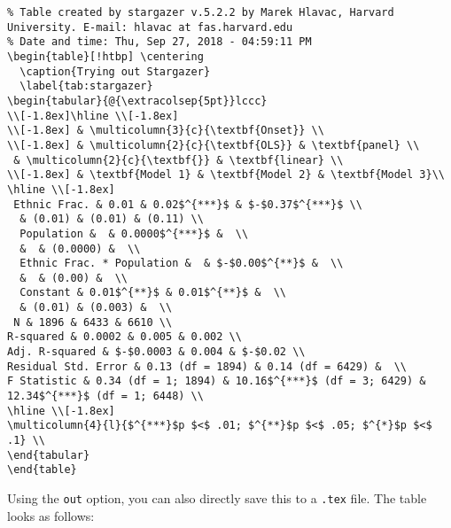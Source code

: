 \begin{lstlisting}
% Table created by stargazer v.5.2.2 by Marek Hlavac, Harvard University. E-mail: hlavac at fas.harvard.edu
% Date and time: Thu, Sep 27, 2018 - 04:59:11 PM
\begin{table}[!htbp] \centering 
  \caption{Trying out Stargazer} 
  \label{tab:stargazer} 
\begin{tabular}{@{\extracolsep{5pt}}lccc} 
\\[-1.8ex]\hline \\[-1.8ex] 
\\[-1.8ex] & \multicolumn{3}{c}{\textbf{Onset}} \\ 
\\[-1.8ex] & \multicolumn{2}{c}{\textbf{OLS}} & \textbf{panel} \\ 
 & \multicolumn{2}{c}{\textbf{}} & \textbf{linear} \\ 
\\[-1.8ex] & \textbf{Model 1} & \textbf{Model 2} & \textbf{Model 3}\\ 
\hline \\[-1.8ex] 
 Ethnic Frac. & 0.01 & 0.02$^{***}$ & $-$0.37$^{***}$ \\ 
  & (0.01) & (0.01) & (0.11) \\ 
  Population &  & 0.0000$^{***}$ &  \\ 
  &  & (0.0000) &  \\ 
  Ethnic Frac. * Population &  & $-$0.00$^{**}$ &  \\ 
  &  & (0.00) &  \\ 
  Constant & 0.01$^{**}$ & 0.01$^{**}$ &  \\ 
  & (0.01) & (0.003) &  \\ 
 N & 1896 & 6433 & 6610 \\ 
R-squared & 0.0002 & 0.005 & 0.002 \\ 
Adj. R-squared & $-$0.0003 & 0.004 & $-$0.02 \\ 
Residual Std. Error & 0.13 (df = 1894) & 0.14 (df = 6429) &  \\ 
F Statistic & 0.34 (df = 1; 1894) & 10.16$^{***}$ (df = 3; 6429) & 12.34$^{***}$ (df = 1; 6448) \\ 
\hline \\[-1.8ex] 
\multicolumn{4}{l}{$^{***}$p $<$ .01; $^{**}$p $<$ .05; $^{*}$p $<$ .1} \\ 
\end{tabular} 
\end{table} 
\end{lstlisting}

Using the \texttt{out} option, you can also directly save this to a \texttt{.tex} file. The table looks as follows:

